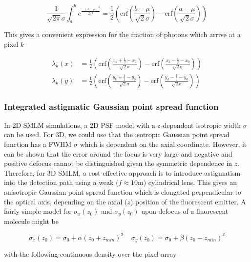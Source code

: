 \documentclass{ucetd}
\begin{document}
\begin{equation*}
\frac{1}{\sqrt{2\pi}\sigma}\int_{a}^{b} e^{\frac{-(x-\mu)^{2}}{2\sigma^{2}}} = \frac{1}{2}\left(\mathrm{erf}\left(\frac{b-\mu}{\sqrt{2}\sigma}\right) -\mathrm{erf}\left(\frac{a-\mu}{\sqrt{2}\sigma}\right)\right)
\end{equation*}

This gives a convenient expression for the fraction of photons which arrive at a pixel $k$

\begin{align*}
\lambda_{k}(x) &= \frac{1}{2}\left(\mathrm{erf}\left(\frac{x_{k}+\frac{1}{2}-x_{0}}{\sqrt{2}\sigma}\right) -\mathrm{erf}\left(\frac{x_{k}-\frac{1}{2}-x_{0}}{\sqrt{2}\sigma}\right)\right)\\
\lambda_{k}(y) &= \frac{1}{2}\left(\mathrm{erf}\left(\frac{y_{k}+\frac{1}{2}-y_{0}}{\sqrt{2}\sigma}\right) -\mathrm{erf}\left(\frac{y_{k}-\frac{1}{2}-y_{0}}{\sqrt{2}\sigma}\right)\right)
\end{align*}

\subsubsection{Integrated astigmatic Gaussian point spread function}

In 2D SMLM simulations, a 2D PSF  model  with  a z-dependent  isotropic  width $\sigma$ can  be  used. For 3D, we could use that the isotropic Gaussian point spread function has a FWHM $\sigma$ which is dependent on the axial coordinate. However, it can be shown that the error around the focus is very large and negative and positive defocus cannot be distinguished given the symmetric dependence in $z$.  Therefore, for 3D SMLM, a cost-effective approach is to introduce astigmatism into the detection path using a weak ($f\approx 10\mathrm{m}$) cylindrical lens. This gives an anisotropic Gaussian point spread function which is elongated perpendicular to the optical axis, depending on the axial ($z$) position of the fluorescent emitter. A fairly simple model for $\sigma_{x}(z_{0})$ and $\sigma_{y}(z_{0})$ upon defocus of a fluorescent molecule might be

\begin{equation*}
\sigma_{x}(z_{0}) = \sigma_{0} + \alpha(z_{0}+z_{min})^{2}\;\;\;\; \sigma_{y}(z_{0}) = \sigma_{0} + \beta(z_{0}-z_{min})^{2}
\end{equation*}

with the following continuous density over the pixel array
\end{document}
